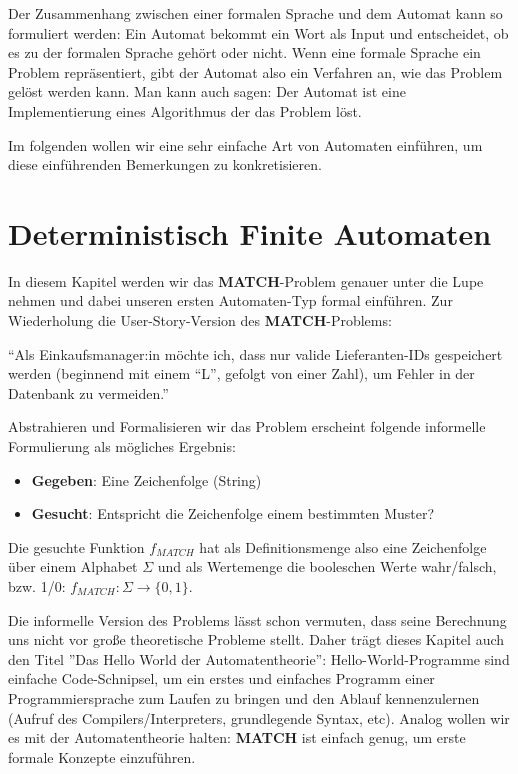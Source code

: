 Der Zusammenhang zwischen einer formalen Sprache und dem Automat kann so formuliert werden:
Ein Automat bekommt ein Wort als Input und entscheidet,
ob es zu der formalen Sprache gehört oder nicht.
Wenn eine formale Sprache ein Problem repräsentiert,
gibt der Automat also ein Verfahren an, 
wie das Problem gelöst werden kann.
Man kann auch sagen:
Der Automat ist eine Implementierung eines Algorithmus der das Problem löst.

Im folgenden wollen wir eine sehr einfache Art von Automaten einführen,
um diese einführenden Bemerkungen zu konkretisieren.

\section{Deterministisch Finite Automaten}
In diesem Kapitel werden wir das \textbf{MATCH}-Problem genauer unter die Lupe nehmen
und dabei unseren ersten Automaten-Typ formal einführen.
Zur Wiederholung die User-Story-Version des \textbf{MATCH}-Problems:
\begin{center}
``Als Einkaufsmanager:in möchte ich, dass nur valide Lieferanten-IDs gespeichert werden
(beginnend mit einem ``L'', gefolgt von einer Zahl),
um Fehler in der Datenbank zu vermeiden.''
\end{center}
Abstrahieren und Formalisieren wir das Problem erscheint folgende informelle Formulierung
als mögliches Ergebnis:
\begin{itemize}
\item \textbf{Gegeben}: Eine Zeichenfolge (String)
\item \textbf{Gesucht}: Entspricht die Zeichenfolge einem bestimmten Muster?
\end{itemize}
Die gesuchte Funktion $f_{MATCH}$ hat als Definitionsmenge also eine Zeichenfolge
über einem Alphabet $\Sigma$ und als Wertemenge die booleschen Werte wahr/falsch,
bzw. 1/0: $f_{MATCH}: \Sigma \rightarrow \{0,1\}$.

Die informelle Version des Problems lässt schon vermuten,
dass seine Berechnung uns nicht vor große theoretische Probleme stellt.
Daher trägt dieses Kapitel auch den Titel ''Das Hello World der Automatentheorie'':
Hello-World-Programme sind einfache Code-Schnipsel,
um ein erstes und einfaches Programm einer Programmiersprache zum Laufen zu bringen
und den Ablauf kennenzulernen (Aufruf des Compilers/Interpreters, grundlegende Syntax, etc).
Analog wollen wir es mit der Automatentheorie halten:
\textbf{MATCH} ist einfach genug, um erste formale Konzepte einzuführen.



